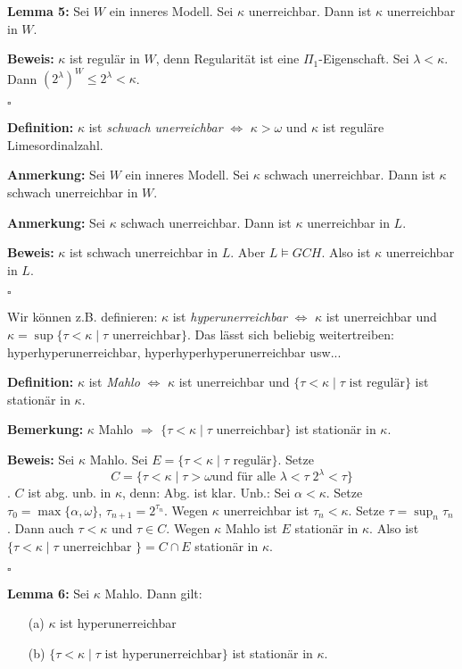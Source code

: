 \documentclass[a4paper,fontsize=11pt]{scrartcl}
\begin{document}
{\bf Lemma 5:} Sei $W$ ein inneres Modell. Sei $\kappa$
unerreichbar. Dann ist $\kappa$ unerreichbar in $W$.

{\bf Beweis:} $\kappa$ ist regulär in $W$, denn Regularität ist eine
$\Pi_1$-Eigenschaft. Sei $\lambda<\kappa$. Dann $(2^{\lambda})^W\le
2^{\lambda}<\kappa$.

\hfill $\square$

{\bf Definition:} $\kappa$ ist \emph{schwach unerreichbar} $\iff$
$\kappa>\omega$ und $\kappa$ ist reguläre Limesordinalzahl.

{\bf Anmerkung:} Sei $W$ ein inneres Modell. Sei $\kappa$ schwach
unerreichbar. Dann ist $\kappa$ schwach unerreichbar in $W$.

{\bf Anmerkung:} Sei $\kappa$ schwach unerreichbar. Dann ist $\kappa$ unerreichbar in $L$.

{\bf Beweis:} $\kappa$ ist schwach unerreichbar in $L$. Aber $L\models
GCH$. Also ist $\kappa$ unerreichbar in $L$.

\hfill $\square$

Wir können z.B. definieren: $\kappa$ ist \emph{hyperunerreichbar}
$\iff$ $\kappa$ ist unerreichbar und $\kappa
=\sup\{\tau<\kappa\mid\tau \mbox{ unerreichbar}\}$. Das lässt sich
beliebig weitertreiben: hyperhyperunerreichbar,
hyperhyperhyperunerreichbar usw...

{\bf Definition:} $\kappa$ ist \emph{Mahlo} $\iff$ $\kappa$ ist
unerreichbar und $\{\tau<\kappa\mid \tau \mbox{ ist regulär}\}$ ist
stationär in $\kappa$.

{\bf Bemerkung:} $\kappa$ Mahlo $\Rightarrow$ $\{ \tau<\kappa\mid \tau\mbox{ unerreichbar}\}$ ist stationär in $\kappa$.

{\bf Beweis:} Sei $\kappa$ Mahlo. Sei $E= \{\tau<\kappa\mid \tau
\mbox{ regulär} \}$. Setze \[C=\{ \tau<\kappa\mid \tau>\omega \mbox{
  und für alle }\lambda<\tau\; 2^{\lambda}<\tau\}\]. $C$ ist
abg. unb. in $\kappa$, denn: Abg. ist klar.  Unb.: Sei
$\alpha<\kappa$.  Setze $\tau_0=\max\{\alpha,\omega\}$,
$\tau_{n+1}=2^{\tau_n}$.  Wegen $\kappa$ unerreichbar ist
$\tau_n<\kappa$.  Setze $\tau=\sup_n\tau_n$.  Dann auch $\tau<\kappa$
und $\tau\in C$.  Wegen $\kappa$ Mahlo ist $E$ stationär in $\kappa$.
Also ist $\{\tau<\kappa\mid \tau\mbox{ unerreichbar }\} = C\cap E$
stationär in $\kappa$.

\hfill $\square$

{\bf Lemma 6:} Sei $\kappa$ Mahlo. Dann gilt: 
\begin{itemize}
\item[(a)] $\kappa$ ist hyperunerreichbar
\item[(b)] $\{\tau<\kappa\mid \tau \mbox{ ist hyperunerreichbar}\}$ ist stationär in $\kappa$.
\end{itemize}
\end{document}
